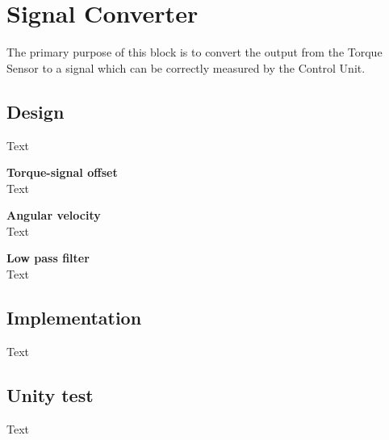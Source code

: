 \section{Signal Converter}
The primary purpose of this block is to convert the output from the Torque Sensor to a signal which can be correctly measured by the Control Unit.

\subsection{Design}
Text

\textbf{Torque-signal offset}\\
Text

\textbf{Angular velocity}\\
Text

\textbf{Low pass filter}\\
Text

\subsection{Implementation}
Text

\subsection{Unity test}
Text
